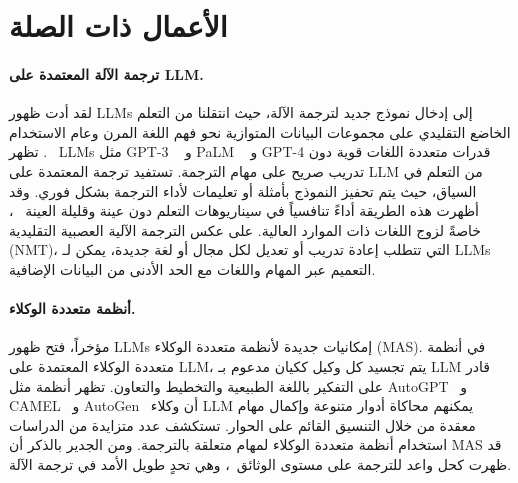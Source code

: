 \documentclass[11pt]{article}
\begin{document}
\section{الأعمال ذات الصلة}

\paragraph{ترجمة الآلة المعتمدة على LLM.}
لقد أدت ظهور LLMs إلى إدخال نموذج جديد لترجمة الآلة، حيث انتقلنا من التعلم الخاضع التقليدي على مجموعات البيانات المتوازية نحو فهم اللغة المرن وعام الاستخدام ~\citep{gain2025bridginglinguisticdividesurvey}. تظهر LLMs مثل GPT-3 ~\citep{brown2020languagemodelsfewshotlearners} و PaLM ~\citep{chowdhery2022palmscalinglanguagemodeling} و GPT-4 قدرات متعددة اللغات قوية دون تدريب صريح على مهام الترجمة. تستفيد ترجمة المعتمدة على LLM من التعلم في السياق، حيث يتم تحفيز النموذج بأمثلة أو تعليمات لأداء الترجمة بشكل فوري. وقد أظهرت هذه الطريقة أداءً تنافسياً في سيناريوهات التعلم دون عينة وقليلة العينة ~\citep{vilar2023promptingpalmtranslationassessing,luo2025decoderonlylargelanguagemodels}، خاصةً لزوج اللغات ذات الموارد العالية. على عكس الترجمة الآلية العصبية التقليدية (NMT)، التي تتطلب إعادة تدريب أو تعديل لكل مجال أو لغة جديدة، يمكن لـ LLMs التعميم عبر المهام واللغات مع الحد الأدنى من البيانات الإضافية.

\paragraph{أنظمة متعددة الوكلاء.}
مؤخراً، فتح ظهور LLMs إمكانيات جديدة لأنظمة متعددة الوكلاء (MAS). في أنظمة متعددة الوكلاء المعتمدة على LLM، يتم تجسيد كل وكيل ككيان مدعوم بـ LLM قادر على التفكير باللغة الطبيعية والتخطيط والتعاون. تظهر أنظمة مثل AutoGPT~\citep{yang2023autogptonlinedecisionmaking} و CAMEL~\citep{li2023camelcommunicativeagentsmind} و AutoGen~\citep{dibia2024autogenstudionocodedeveloper} أن وكلاء LLM يمكنهم محاكاة أدوار متنوعة وإكمال مهام معقدة من خلال التنسيق القائم على الحوار. تستكشف عدد متزايدة من الدراسات استخدام أنظمة متعددة الوكلاء لمهام متعلقة بالترجمة. ومن الجدير بالذكر أن MAS قد ظهرت كحل واعد للترجمة على مستوى الوثائق~\citep{wang2025deltaonlinedocumentleveltranslation}، وهي تحدٍ طويل الأمد في ترجمة الآلة.
\end{document}
